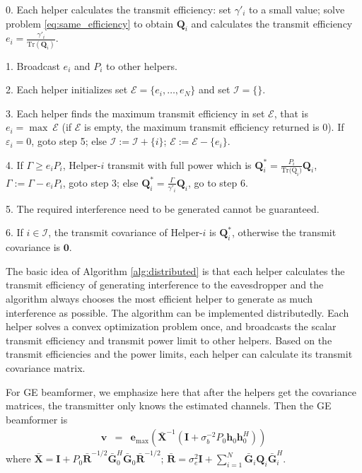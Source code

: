 \documentclass[journal]{IEEEtran}
\begin{document}
\begin{algorithm}
	\caption{}\label{alg:distributed}
	\begin{algorithmic}
		\item[0.] Each helper calculates the transmit efficiency: set $\gamma'_i$ to a small value; solve problem \eqref{eq:same_efficiency} to obtain $\mathbf{Q}_i$ and calculates the transmit efficiency $e_i = \frac{\gamma'_{i}}{\mathrm{Tr}(\mathbf{Q}_i)}$. 
		\item[1.] Broadcast $e_i$ and $P_i$ to other helpers. 
		\item[2.] Each helper initializes set $\mathcal{E} =\{ {e_i,\ldots, e_N}\}$ and set $\mathcal{I} =\{\}$.
		\item[3.] Each helper finds the maximum transmit efficiency in set $\mathcal{E}$, that is $e_i = \max~\mathcal{E}$ (if $\mathcal{E}$ is empty,  the maximum transmit efficiency returned is 0). If $\varepsilon_i = 0$, goto step 5; else $\mathcal{I} := \mathcal{I} + \{i\}$; $\mathcal{E} := \mathcal{E}  - \{e_i\}$.
		\item[4.] If $\Gamma \geq e_{i} P_i$, Helper-$i$ transmit with full power which is $\mathbf{Q}_{i}^* = \frac{P_i}{\mathrm{Tr(\mathrm{Q}}_i)}\mathbf{Q}_i$, $\Gamma := \Gamma - e_iP_i$, goto step 3; else $\mathbf{Q}_{i}^* = \frac{\Gamma}{\gamma'_i}\mathbf{Q}_i$, go to step 6.
		\item[5.] The required interference need to be generated cannot be guaranteed.
		\item[6.] If $i \in \mathcal{I}$, the transmit covariance of Helper-$i$ is $\mathbf{Q}_i^*$, otherwise the transmit covariance is $\mathbf{0}$.
		
	\end{algorithmic}
\end{algorithm}

The basic idea of Algorithm \ref{alg:distributed} is that each helper calculates the transmit efficiency of generating interference to the eavesdropper and the algorithm always chooses the most efficient helper to generate as much interference as possible. The algorithm can be implemented distributedly. Each helper solves a convex optimization problem once, and broadcasts the scalar transmit efficiency and transmit power limit to other helpers. Based on the transmit efficiencies and the power limits, each helper can calculate its transmit covariance matrix.

For GE beamformer, we emphasize here that after the helpers get the covariance matrices, the transmitter only knows the estimated channels. Then the GE beamformer is
\begin{eqnarray}
\mathbf{v}&=&\mathbf{e}_{\text{max}}\left(\bar{\mathbf{X}}^{-1}\left(\mathbf{I} + \sigma_b^{-2}P_0\mathbf{h}_0\mathbf{h}_0^H\right)\right)
\end{eqnarray}
where $\bar{\mathbf{X}} = \mathbf{I} + P_0\bar{\mathbf{R}}^{-1/2}\bar{\mathbf{G}}_0^H\bar{\mathbf{G}}_0\bar{\mathbf{R}}^{-1/2}$; $\bar{\mathbf{R}} = \sigma_e^2\mathbf{I}+\sum_{i=1}^{N}\bar{\mathbf{G}}_i\mathbf{Q}_i\bar{\mathbf{G}}_i^H$.
\end{document}

